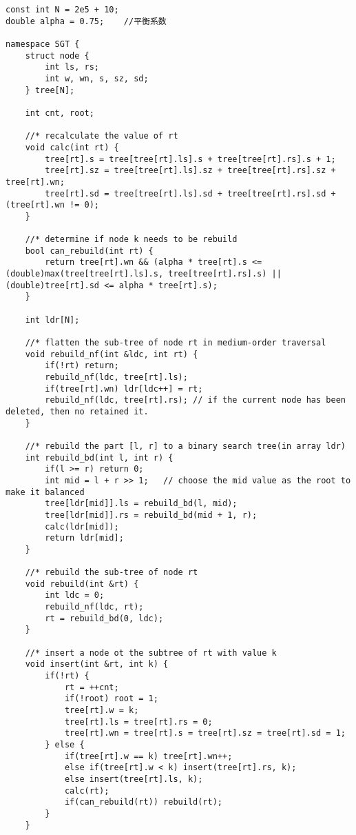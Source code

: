 \documentclass[]{article}
\begin{document}
\begin{verbatim}
const int N = 2e5 + 10;
double alpha = 0.75;    //平衡系数

namespace SGT {
    struct node {
        int ls, rs;
        int w, wn, s, sz, sd;
    } tree[N];
    
    int cnt, root;
    
    //* recalculate the value of rt 
    void calc(int rt) {
        tree[rt].s = tree[tree[rt].ls].s + tree[tree[rt].rs].s + 1;
        tree[rt].sz = tree[tree[rt].ls].sz + tree[tree[rt].rs].sz + tree[rt].wn;
        tree[rt].sd = tree[tree[rt].ls].sd + tree[tree[rt].rs].sd + (tree[rt].wn != 0);
    }

    //* determine if node k needs to be rebuild
    bool can_rebuild(int rt) {
        return tree[rt].wn && (alpha * tree[rt].s <= (double)max(tree[tree[rt].ls].s, tree[tree[rt].rs].s) || (double)tree[rt].sd <= alpha * tree[rt].s);   
    }

    int ldr[N];

    //* flatten the sub-tree of node rt in medium-order traversal
    void rebuild_nf(int &ldc, int rt) {
        if(!rt) return;
        rebuild_nf(ldc, tree[rt].ls);
        if(tree[rt].wn) ldr[ldc++] = rt;
        rebuild_nf(ldc, tree[rt].rs); // if the current node has been deleted, then no retained it.
    }

    //* rebuild the part [l, r] to a binary search tree(in array ldr)
    int rebuild_bd(int l, int r) {
        if(l >= r) return 0;
        int mid = l + r >> 1;   // choose the mid value as the root to make it balanced
        tree[ldr[mid]].ls = rebuild_bd(l, mid);
        tree[ldr[mid]].rs = rebuild_bd(mid + 1, r);
        calc(ldr[mid]);
        return ldr[mid];
    }

    //* rebuild the sub-tree of node rt
    void rebuild(int &rt) {
        int ldc = 0;
        rebuild_nf(ldc, rt);
        rt = rebuild_bd(0, ldc);
    }

    //* insert a node ot the subtree of rt with value k
    void insert(int &rt, int k) {
        if(!rt) {
            rt = ++cnt;
            if(!root) root = 1;
            tree[rt].w = k;
            tree[rt].ls = tree[rt].rs = 0;
            tree[rt].wn = tree[rt].s = tree[rt].sz = tree[rt].sd = 1;
        } else {
            if(tree[rt].w == k) tree[rt].wn++;
            else if(tree[rt].w < k) insert(tree[rt].rs, k);
            else insert(tree[rt].ls, k);
            calc(rt);
            if(can_rebuild(rt)) rebuild(rt);
        }
    }


\end{verbatim}
\end{document}
